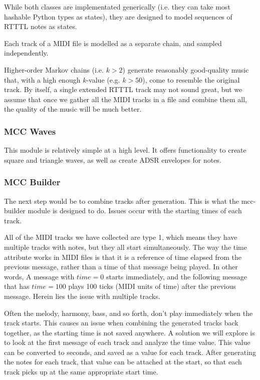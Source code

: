 \documentclass{article}
\begin{document}
While both classes are implementated generically (i.e. they can take most hashable Python types as states), they are designed to model sequences of RTTTL notes as states. 

Each track of a MIDI file is modelled as a separate chain, and sampled independently. 

Higher-order Markov chains (i.e. $k>2$) generate reasonably good-quality music that, with a high enough $k$-value (e.g. $k>50$), come to resemble the original track. By itself, 
a single extended RTTTL track may not sound great, but we assume that once we gather all the MIDI tracks in a file and combine them all, the quality of the music will be much 
better. 

\subsubsection{MCC Waves}
This module is relatively simple at a high level. It offers functionality to create square and triangle waves, as well as create ADSR envelopes for notes.

\subsubsection{MCC Builder}
The next step would be to combine tracks after generation. This is what the mcc-builder module is designed to do. Issues occur with the starting times of each track. 

All of the MIDI tracks we have collected are type 1, which means they have multiple tracks with notes, but they all start simultaneously. The way the time attribute works in 
MIDI files is that it is a reference of time elapsed from the previous message, rather than a time of that message being played. In other words, A message with $time = 0$ 
starts immediately, and the following message that has $time = 100$ plays 100 ticks (MIDI units of time) after the previous message. Herein lies the issue with multiple tracks. 

Often the melody, harmony, bass, and so forth, don't play immediately when the track starts. This causes an issue when combining the generated tracks back together, as the 
starting time is not saved anywhere. A solution we will explore is to look at the first message of each track and analyze the time value. This value can be converted to 
seconds, and saved as a value for each track. After generating the notes for each track, that value can be attached at the start, so that each track picks up at the same 
appropriate start time. 
\end{document}
